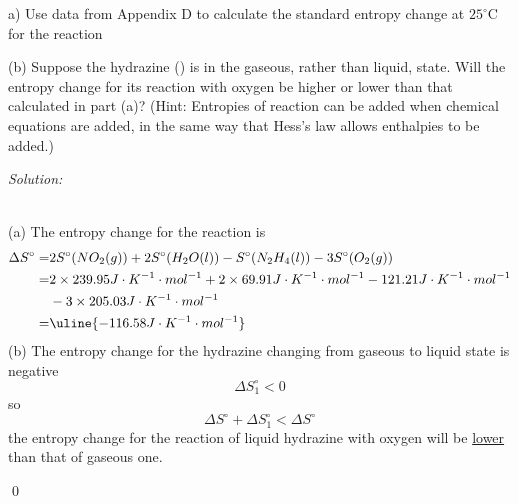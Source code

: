 \documentclass[12pt]{article}
\newenvironment{problem}[2][Problem]{\begin{trivlist}
\item[\hskip \labelsep {\bfseries #1}\hskip \labelsep {\bfseries #2.}]}{\end{trivlist}}
\newenvironment{sol}
    {\emph{Solution:}
    }
    {
    \qed
    }
\begin{document}
\begin{problem}{13.21}
(a) Use data from Appendix D to calculate the standard entropy change at $25^{\circ}$C for the reaction
\begin{center}
\end{center}
(b) Suppose the hydrazine () is in the gaseous, rather than liquid, state. Will the entropy change for its reaction with oxygen be higher or lower than that calculated in part (a)? (Hint: Entropies of reaction can be added when chemical equations are added, in the same way that Hess’s law allows enthalpies to be added.)
\end{problem}
\begin{sol}
\\(a) The entropy change for the reaction is
\begin{align*}
\Delta S^{\circ}=&2S^{\circ}(NO_2(g))+2S^{\circ}(H_2O(l))-S^{\circ}(N_2H_4(l))-3S^{\circ}(O_2(g))\\
=&2\times239.95J\cdot K^{-1}\cdot mol^{-1}+2\times69.91J\cdot K^{-1}\cdot mol^{-1}-121.21J\cdot K^{-1}\cdot mol^{-1}\\
&-3\times205.03J\cdot K^{-1}\cdot mol^{-1}\\
=&\uline{-116.58J\cdot K^{-1}\cdot mol^{-1}}
\end{align*}
(b) The entropy change for the hydrazine changing from gaseous to liquid state is negative
\[
\Delta S_1^{\circ}<0
\]
so
\[
\Delta S^{\circ}+\Delta S_1^{\circ}<\Delta S^{\circ}
\]
the entropy change for the reaction of liquid hydrazine with oxygen will be \uline{lower} than that of gaseous one.  
\end{sol}
\end{document}
